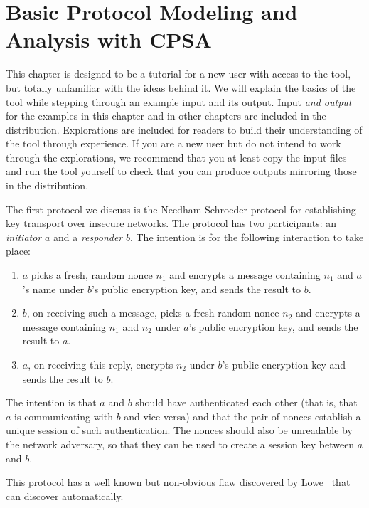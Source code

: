 \chapter{Basic Protocol Modeling and Analysis with CPSA}
\label{ch:basic}

This chapter is designed to be a tutorial for a new user with access
to the tool, but totally unfamiliar with the ideas behind it.  We will
explain the basics of the tool while stepping through an example input
and its output.  Input \emph{and output} for the examples in this
chapter and in other chapters are included in the distribution.
Explorations are included for readers to build their understanding of the
tool through experience.  If you are a new user but do not intend to
work through the explorations, we recommend that you at least copy the
input files and run the tool yourself to check that you can produce
outputs mirroring those in the distribution.

The first protocol we discuss is the Needham-Schroeder protocol for
establishing key transport over insecure networks.  The protocol has
two participants: an \emph{initiator} $a$ and a \emph{responder} $b$.
The intention is for the following interaction to take place:

\begin{enumerate}
\item $a$ picks a fresh, random nonce $n_1$ and encrypts a message
  containing $n_1$ and $a$'s name under $b$'s public encryption key,
  and sends the result to $b$.

\item $b$, on receiving such a message, picks a fresh random nonce
  $n_2$ and encrypts a message containing $n_1$ and $n_2$ under $a$'s
  public encryption key, and sends the result to $a$.

\item $a$, on receiving this reply, encrypts $n_2$ under $b$'s public
  encryption key and sends the result to $b$.
\end{enumerate}

The intention is that $a$ and $b$ should have authenticated each
other (that is, that $a$ is communicating with $b$ and vice versa) and
that the pair of nonces establish a unique session of such
authentication.  The nonces should also be unreadable by the network
adversary, so that they can be used to create a session key between
$a$ and $b$.

This protocol has a well known but non-obvious flaw discovered by
Lowe~\cite{Lowe96a} that {\cpsa} can discover automatically.

